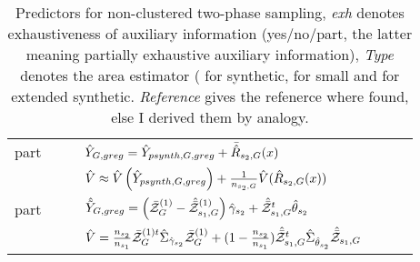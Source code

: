 \begin{table}
\begin{tabular}{l l l l l r l}
part 	&  \psmall{} 	& \cite[eq. 24]{Man13b} & $\hat{Y}_{G,greg} = \hat{Y}_{psynth,G,greg} + \bar{\hat{R}}_{s_2,G}(x)$\\
            &      	& \cite[eq. 23]{Man13b} & $\hat{V} \approx \hat{V}\left(\hat{Y}_{psynth,G,greg}\right) + \frac{1}{n_{s_2,G}}\hat{V}(\hat{R}_{s_2,G}(x))$\\
\lightrule

part 	&  \pextended{} 	& \cite[eq. 30]{Man13b} & $\hat{\tilde{Y}}_{G,greg} = \left( \bar{\mathcal{Z}}_G^{(1)}- \hat{\bar{\mathcal{Z}}}_{s_1,G}^{(1)}\right) \hat{\gamma}_{s_2} + \hat{\bar{\mathcal{Z}}}^t_{s_1,G}\hat{\theta}_{s_2}$\\
        &    	&     \cite[eq. 31]{Man13b} & $\hat{V} = \frac{n_{s_2}}{n_{s_1}}\bar{\mathcal{Z}}^{(1)t}_G \hat{\Sigma}_{ \hat{\gamma}_{s_2}} \bar{\mathcal{Z}}^{(1)}_G + (1-\frac{n_{s_2}}{n_{s_1}})\hat{\bar{\mathcal{Z}}}^{t}_{s_1,G} \hat{\Sigma}_{ \hat{\theta}_{s_2}} \hat{\bar{\mathcal{Z}}}_{s_1,G} $\\
\end{tabular}
\caption{Predictors for non-clustered two-phase sampling, 
    \emph{exh} denotes exhaustiveness of auxiliary information (yes/no/part, the
    latter meaning partially exhaustive auxiliary information),
    \emph{Type} denotes the area estimator (\psynthetic{} for synthetic, \psmall{}
    for small and \pextended{} for extended synthetic. \emph{Reference} gives the
    refenerce where found, else I derived them by analogy. \label{tab:unclustered2}
}
\end{table}
